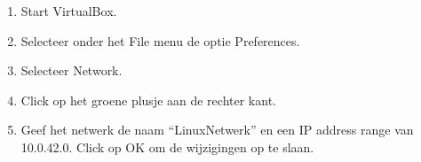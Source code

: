 
\begin{enumerate}
	\item Start VirtualBox.
	\item Selecteer onder het File menu de optie Preferences.
	\item Selecteer Network.
	\item
		\begin{minipage}[t]{\linewidth}
		\raggedright
		Click op het groene plusje aan de rechter kant.
		\end{minipage}

	\item
		\begin{minipage}[t]{\linewidth}
		\raggedright
		Geef het netwerk de naam ``LinuxNetwerk'' en een IP address range van 10.0.42.0. Click op OK om de wijzigingen op te slaan.
		\end{minipage}
\end{enumerate}

